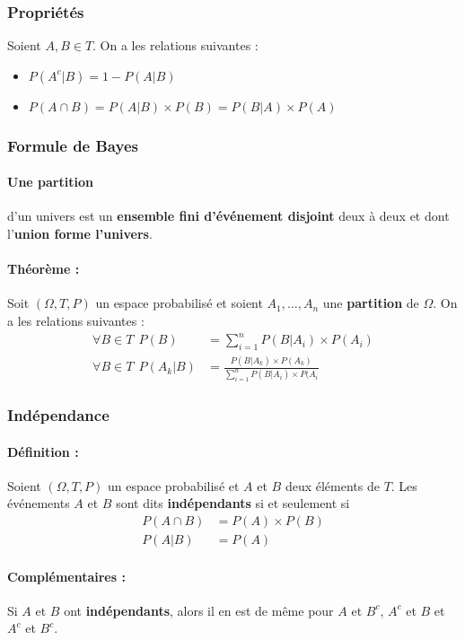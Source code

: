 \documentclass[10pt,a4paper,twoside]{article}
\begin{document}
\subsubsection{Propriétés}
Soient $A,B \in T$. On a les relations suivantes :
\begin{itemize}
\item $P(A^{c}|B) = 1-P(A|B)$
\item $P(A\cap B) = P(A|B)\times P(B) = P(B|A)\times P(A)$
\end{itemize}


\subsubsection{Formule de Bayes}
\paragraph{Une partition }d'un univers est un \textbf{ensemble fini d'événement disjoint} deux à deux et dont l'\textbf{union forme l'univers}.

\paragraph{Théorème :} Soit $(\Omega,T,P)$ un espace probabilisé et soient $A_{1},\ldots,A_{n}$ une \textbf{partition} de $\Omega$. On a les relations suivantes :
\begin{align*}
\forall B \in T\ \  P(B)&=\sum_{i=1}^{n}P(B|A_{i})\times P(A_{i})\\
\forall B \in T\ \  P(A_{k}|B)&=\frac{P(B|A_{k})\times P(A_{k})}{\sum_{i=1}^{n}P(B|A_{i})\times P(A_{i}}
\end{align*}

\subsubsection{Indépendance}
\paragraph{Définition :} Soient $(\Omega,T,P)$ un espace probabilisé et $A$ et $B$ deux éléments de $T$. Les événements $A$ et $B$ sont dits \textbf{indépendants} si et seulement si
\begin{align*}
P(A\cap B)&= P(A) \times P(B)\\
P(A|B) &= P(A)
\end{align*}

\paragraph{Complémentaires :} Si $A$ et $B$ ont \textbf{indépendants}, alors il en est de même pour $A$ et $B^{c}$, $A^{c}$ et $B$ et $A^{c}$ et $B^{c}$.
\end{document}
